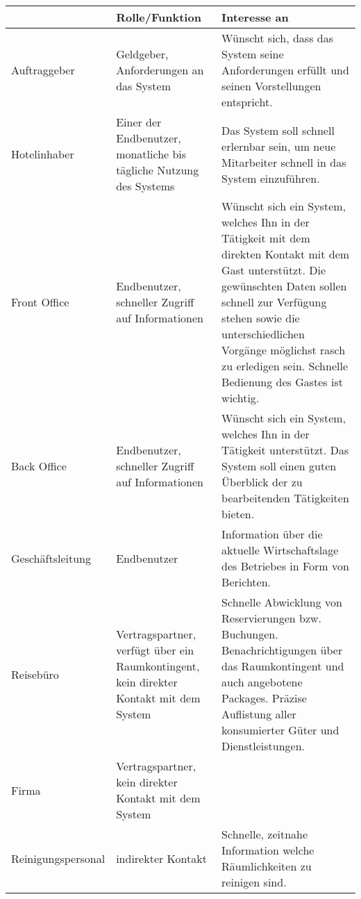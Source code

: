 \centering
\begin{longtable}{|p{3.5cm}|p{5cm}|p{6cm}|}
    \hline
    & Rolle/Funktion & Interesse an \\       \hline

    Auftraggeber &
    Geldgeber, Anforderungen an das System &
    Wünscht sich, dass das System seine Anforderungen erfüllt und seinen Vorstellungen entspricht.
    \\       \hline
    Hotelinhaber &
    Einer der Endbenutzer, monatliche bis tägliche Nutzung des Systems &
    Das System soll schnell erlernbar sein, um neue Mitarbeiter schnell in das System einzuführen.
    \\      \hline

    Front Office &
    Endbenutzer, schneller Zugriff auf Informationen &
    Wünscht sich ein System, welches Ihn in der Tätigkeit mit dem direkten Kontakt mit dem Gast unterstützt.
    Die gewünschten Daten sollen schnell zur Verfügung stehen sowie die unterschiedlichen Vorgänge möglichst rasch zu erledigen sein. Schnelle Bedienung des Gastes ist wichtig.
    \\       \hline

    Back Office &
    Endbenutzer, schneller Zugriff auf Informationen &
    Wünscht sich ein System, welches Ihn in der Tätigkeit unterstützt. Das System soll einen guten Überblick der zu bearbeitenden Tätigkeiten bieten.
    \\       \hline

    Geschäftsleitung &
    Endbenutzer &
    Information über die aktuelle Wirtschaftslage des Betriebes in Form von Berichten.
    \\       \hline

    Reisebüro &
    Vertragspartner, verfügt über ein Raumkontingent, kein direkter Kontakt mit dem System &
    Schnelle Abwicklung von Reservierungen bzw. Buchungen. Benachrichtigungen über das Raumkontingent und auch angebotene
    Packages. Präzise Auflistung aller konsumierter Güter und Dienstleistungen.
    \\       \hline

    Firma &
    Vertragspartner, kein direkter Kontakt mit dem System &

    \\       \hline

    Reinigungspersonal &
    indirekter Kontakt &
    Schnelle, zeitnahe Information welche Räumlichkeiten zu reinigen sind.
    \\       \hline


\end{longtable}
